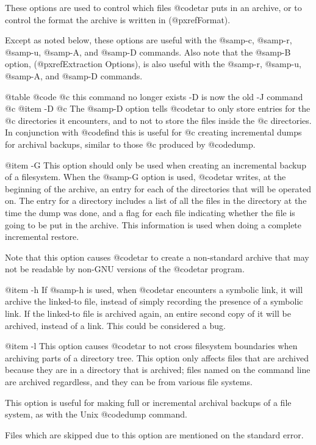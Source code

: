 These options are used to control which files @code{tar} puts in an
archive, or to control the format the archive is written in (@pxref{Format}).

Except as noted below, these options are useful with the @samp{-c},
@samp{-r}, @samp{-u}, @samp{-A}, and @samp{-D} commands.
Also note that the @samp{-B} option, (@pxref{Extraction Options}),
is also useful with the @samp{-r}, @samp{-u}, @samp{-A}, and @samp{-D} commands.

@table @code
@c this command no longer exists  -D is now the old -J command
@c @item -D
@c The @samp{-D} option tells @code{tar} to only store entries for the
@c directories it encounters, and to not to store the files inside the
@c directories.  In conjunction with @code{find} this is useful for
@c creating incremental dumps for archival backups, similar to those
@c produced by @code{dump}.

@item -G
This option should only be used when creating an incremental backup of
a filesystem.  When the @samp{-G} option is used, @code{tar} writes, at
the beginning of the archive, an entry for each of the directories that
will be operated on.  The entry for a directory includes a list of all
the files in the directory at the time the dump was done, and a flag
for each file indicating whether the file is going to be put in the
archive.  This information is used when doing a complete incremental
restore.

Note that this option causes @code{tar} to create a non-standard
archive that may not be readable by non-GNU versions of the @code{tar}
program.

@item -h
If @samp{-h} is used, when @code{tar} encounters a symbolic link, it
will archive the linked-to file, instead of simply recording the
presence of a symbolic link.  If the linked-to file is archived
again, an entire second copy of it will be archived, instead of a
link.  This could be considered a bug.

@item -l
This option causes @code{tar} to not cross filesystem boundaries
when archiving parts of a directory tree.  This option only
affects files that are archived because they are in a directory that
is archived; files named on the command line are archived
regardless, and they can be from various file systems.

This option is useful for making full or incremental archival backups of
a file system, as with the Unix @code{dump} command.

Files which are skipped due to this option are mentioned on the
standard error.

